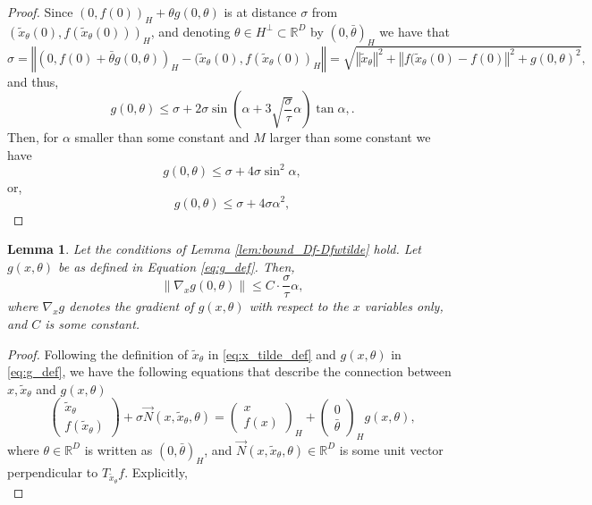 \documentclass[12pt]{article}
\newtheorem{Lemma}[Theorem]{Lemma}
\theoremstyle{remark}
\newcommand{\RR}{\mathbb{R}}
\newcommand{\norm}[1]{\left\Vert #1 \right\Vert}
\newcommand{\wtilde}[1]{\widetilde{#1}}
\begin{document}
\begin{appendices}
\begin{proof}
    Since $(0, f(0))_H + \theta g(0,\theta)$ is at distance  $\sigma$ from $(\wtilde{x}_\theta(0), f(\wtilde{x}_\theta(0)))_H$, and denoting $\theta\in H^\perp\subset \RR^D$ by $(0, \bar \theta)_H$ we have that
    \[
    \sigma  =
    \norm{(0, f(0) + \bar \theta g(0, \theta)  )_H -(\wtilde x_{\theta}(0), f(\wtilde x_\theta(0))_H}
    = \sqrt{\norm{\wtilde x_\theta}^2 + \norm{f(\wtilde x_\theta(0) - f(0)}^2 + g(0,\theta)^2 },\]
    and thus,
    \[
    g(0,\theta) \leq \sigma + 2\sigma \sin (\alpha + 3\sqrt{\frac{\sigma}{\tau}}\alpha) \tan \alpha,
    .\]
    Then, for $\alpha$ smaller than some constant and $M$ larger than some constant we have 
    \[
    g(0,\theta) \leq \sigma + 4\sigma \sin^2 \alpha,
    \] 
    or,
    \[
    g(0,\theta) \leq \sigma + 4\sigma \alpha^2,
    \] 
\end{proof}
\begin{Lemma}\label{lem:bound_nablag}
Let the conditions of Lemma \ref{lem:bound_Df-Dfwtilde} hold.
Let $g(x, \theta)$ be as defined in Equation \eqref{eq:g_def}. Then, 
\[
\|\nabla_x{g}(0,\theta)\| \leq C \cdot \frac{\sigma}{\tau}\alpha 
,\]
where $\nabla_x{g}$ denotes the gradient of $g(x, \theta)$ with respect to the $x$ variables only, and $C$ is some constant.
\end{Lemma}
\begin{proof}
Following the definition of $\wtilde{x}_\theta$ in \eqref{eq:x_tilde_def} and $g(x,\theta)$ in \eqref{eq:g_def}, we have the following equations that describe the connection between $x, \wtilde{x}_\theta$ and $g(x,\theta)$
\begin{equation*}
\left(\begin{array}{c}
     \wtilde{x}_\theta \\
     f(\wtilde{x}_\theta) 
\end{array}\right)
+
\sigma \vec N(x,\wtilde{x}_\theta,\theta) = 
\left(\begin{array}{c}
     x \\
     f(x) 
\end{array}\right)_H
+ 
\left(\begin{array}{c}
     0 \\
     \bar \theta
\end{array}\right)_H g(x,\theta)
,\end{equation*}
where $\theta\in \RR^D$ is written as $(0, \bar \theta)_H$, and $ \vec N(x,\wtilde{x}_\theta,\theta)\in \RR^D$ is some unit vector perpendicular to $T_{\wtilde{x}_\theta}f$.
Explicitly, 
\begin{equation}\label{eq:c_2}

\end{equation}
\end{proof}
\end{appendices}
\end{document}
